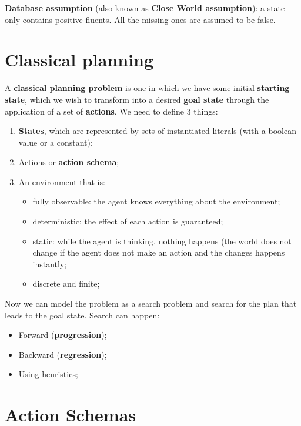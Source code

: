 \documentclass{article}
\begin{document}
\textbf{Database assumption} (also known as \textbf{Close World assumption}): a state only contains positive fluents. All the missing ones are assumed to be false.

\newpage

\section{Classical planning}

A \textbf{classical planning problem} is one in which we have some initial \textbf{starting state}, which we wish to transform into a desired \textbf{goal state} through the application of a set of \textbf{actions}. We need to define 3 things:

\begin{enumerate}
    \item \textbf{States}, which are represented by sets of instantiated literals (with a boolean value or a constant);
    \item Actions or \textbf{action schema};
    \item An environment that is:
    \begin{itemize}
        \item fully observable: the agent knows everything about the environment;
        \item deterministic: the effect of each action is guaranteed;
        \item static: while the agent is thinking, nothing happens (the world does not change if the agent does not make an action and the changes happens instantly;
        \item discrete and finite;
    \end{itemize}
\end{enumerate}

Now we can model the problem as a search problem and search for the plan that leads to the goal state. Search can happen:

\begin{center}
    \begin{itemize}
        \item Forward (\textbf{progression});
        \item Backward (\textbf{regression});
        \item Using heuristics;
    \end{itemize}
\end{center}

\newpage

\section{Action Schemas}
\end{document}
